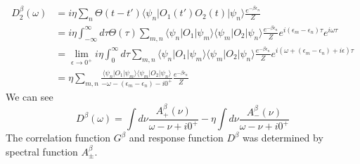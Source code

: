\documentclass[a4paper,11pt]{article}
\begin{document}
\begin{equation*}
  \begin{split}
     D_2^\beta(\omega)&=i\eta\sum_{n}\Theta(t-t')\langle\psi_n|O_1(t')O_2(t)|\psi_n\rangle\frac{e^{-\beta\epsilon_n}}{Z}\\
       &=i\eta\int_{-\infty}^{\infty}d\tau\Theta(\tau)\sum_{m,n}\langle\psi_n|O_1|\psi_m\rangle\langle\psi_m|O_2|\psi_n\rangle\frac{e^{-\beta\epsilon_n}}{Z}e^{i(\epsilon_m-\epsilon_n)\tau}e^{i\omega\tau}\\
       &=\lim_{\epsilon\to0^+}i\eta\int_{0}^{\infty}d\tau\sum_{m,n}\langle\psi_n|O_1|\psi_m\rangle\langle\psi_m|O_2|\psi_n\rangle\frac{e^{-\beta\epsilon_n}}{Z}e^{i(\omega+(\epsilon_m-\epsilon_n)+i\epsilon)\tau}\\
       &=\eta\sum_{m,n}\frac{\langle\psi_n|O_1|\psi_m\rangle\langle\psi_m|O_2|\psi_n\rangle}{-\omega-(\epsilon_m-\epsilon_n)-i0^+}\frac{e^{-\beta\epsilon_n}}{Z}
  \end{split}
\end{equation*}
We can see
\begin{equation*}
  D^\beta(\omega)=\int d\nu\frac{A_+^\beta(\nu)}{\omega-\nu+i0^+}-\eta\int d\nu\frac{A_-^\beta(\nu)}{\omega-\nu+i0^+}
\end{equation*}
The correlation function $G^\beta$ and response function $D^\beta$ was determined by spectral function $A_\pm^\beta$.
\end{document}
